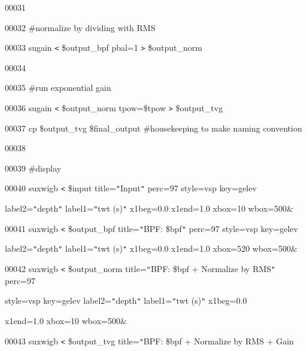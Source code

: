\documentclass{article}
\begin{document}
\vspace{4pt}
00031 

\vspace{4pt}
00032 \#normalize by dividing with RMS

\vspace{4pt}
00033 sugain \texttt{<} \$output\_bpf pbal=1 \texttt{>} \$output\_norm

\vspace{4pt}
00034 

\vspace{4pt}
00035 \#run exponential gain

\vspace{4pt}
00036 sugain \texttt{<} \$output\_norm tpow=\$tpow \texttt{>} \$output\_tvg

\vspace{4pt}
00037 cp \$output\_tvg \$final\_output \#housekeeping to make naming convention

\vspace{4pt}
00038 

\vspace{4pt}
00039 \#display

\vspace{4pt}
00040 suxwigb \texttt{<} \$input title=\texttt{"}Input\texttt{"} perc=97 style=vsp 
key=gelev 

\vspace{4pt}
label2=\texttt{"}depth\texttt{"} label1=\texttt{"}twt (s)\texttt{"} x1beg=0.0 x1end=1.0 
xbox=10 wbox=500\&

\vspace{4pt}
00041 suxwigb \texttt{<} \$output\_bpf title=\texttt{"}BPF: \$bpf\texttt{"} perc=97 
style=vsp key=gelev 

\vspace{4pt}
label2=\texttt{"}depth\texttt{"} label1=\texttt{"}twt (s)\texttt{"} x1beg=0.0 x1end=1.0 
xbox=520 wbox=500\&

\vspace{4pt}
00042 suxwigb \texttt{<} \$output\_norm title=\texttt{"}BPF: \$bpf + Normalize 
by RMS\texttt{"} perc=97 

\vspace{4pt}
style=vsp key=gelev label2=\texttt{"}depth\texttt{"} label1=\texttt{"}twt (s)\texttt{"} 
x1beg=0.0 

\vspace{4pt}
x1end=1.0 xbox=10 wbox=500\&

\vspace{4pt}
00043 suxwigb \texttt{<} \$output\_tvg title=\texttt{"}BPF: \$bpf + Normalize by 
RMS + Gain 
\end{document}
